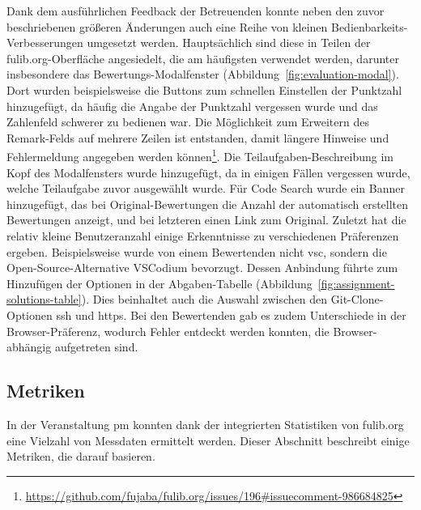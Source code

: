 Dank dem ausführlichen Feedback der Betreuenden konnte neben den zuvor beschriebenen größeren Änderungen auch eine Reihe von kleinen Bedienbarkeits-Verbesserungen umgesetzt werden.
Hauptsächlich sind diese in Teilen der fulib.org-Oberfläche angesiedelt, die am häufigsten verwendet werden, darunter insbesondere das Bewertungs-Modalfenster (Abbildung~\ref{fig:evaluation-modal}).
Dort wurden beispielsweise die Buttons zum schnellen Einstellen der Punktzahl hinzugefügt, da häufig die Angabe der Punktzahl vergessen wurde und das Zahlenfeld schwerer zu bedienen war.
Die Möglichkeit zum Erweitern des Remark-Felds auf mehrere Zeilen ist entstanden, damit längere Hinweise und Fehlermeldung angegeben werden können\footnote{\label{fn:nataschu-ha4}
    \url{https://github.com/fujaba/fulib.org/issues/196\#issuecomment-986684825}
}.
Die Teilaufgaben-Beschreibung im Kopf des Modalfensters wurde hinzugefügt, da in einigen Fällen vergessen wurde, welche Teilaufgabe zuvor ausgewählt wurde.
Für Code Search wurde ein Banner hinzugefügt, das bei Original-Bewertungen die Anzahl der automatisch erstellten Bewertungen anzeigt, und bei letzteren einen Link zum Original.
Zuletzt hat die relativ kleine Benutzeranzahl einige Erkenntnisse zu verschiedenen Präferenzen ergeben.
Beispielsweise wurde von einem Bewertenden nicht \ac{vsc}, sondern die Open-Source-Alternative VSCodium bevorzugt.
Dessen Anbindung führte zum Hinzufügen der Optionen in der Abgaben-Tabelle (Abbildung~\ref{fig:assignment-solutions-table}).
Dies beinhaltet auch die Auswahl zwischen den Git-Clone-Optionen \ac{ssh} und \ac{https}.
Bei den Bewertenden gab es zudem Unterschiede in der Browser-Präferenz, wodurch Fehler entdeckt werden konnten, die Browser-abhängig aufgetreten sind.

\subsection{Metriken}\label{subsec:pm-metrics}

In der Veranstaltung \ac{pm} konnten dank der integrierten Statistiken von fulib.org eine Vielzahl von Messdaten ermittelt werden.
Dieser Abschnitt beschreibt einige Metriken, die darauf basieren.

